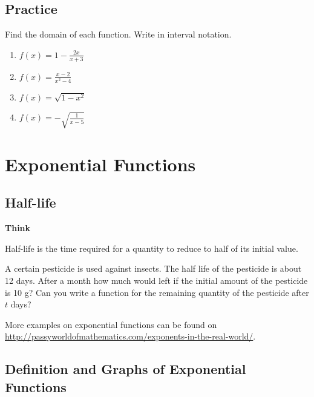 \documentclass[en,12pt]{elegantbook}
\providecommand{\tightlist}{%
  \setlength{\itemsep}{0pt}\setlength{\parskip}{0pt}}
\newenvironment{rmdthink}{
	\par\noindent
	{
		\makebox[-\width][r]{
			\footnotesize
			\color{green!90}\faLightbulbO
			\hspace*{3pt}
		}
			\textbf{
				\color{second}
				Think 
			}
    }
    \begin{shaded}
    \sffamily
}{
    \par\medskip\ignorespacesafterend
    \end{shaded}
}
\providecommand{\tightlist}{%
  \setlength{\itemsep}{0pt}\setlength{\parskip}{0pt}}
\let\BeginKnitrBlock\begin \let\EndKnitrBlock\end
\begin{document}
\hypertarget{practice-14}{%
\section{Practice}\label{practice-14}}

\BeginKnitrBlock{exercise}
\protect\hypertarget{exr:unnamed-chunk-275}{}{\label{exr:unnamed-chunk-275} }
Find the domain of each function. Write in interval notation.

\begin{enumerate}
\def\labelenumi{\arabic{enumi}.}
\tightlist
\item
  \(f(x)=1-\frac{2x}{x+3}\)
\item
  \(f(x)=\frac{x-2}{x^2-4}\)
\item
  \(f(x)=\sqrt{1-x^2}\)
\item
  \(f(x)=-\sqrt{\frac{1}{x-5}}\)
\end{enumerate}
\EndKnitrBlock{exercise}

\hypertarget{exponential-functions}{%
\chapter{Exponential Functions}\label{exponential-functions}}

\hypertarget{half-life}{%
\section{Half-life}\label{half-life}}

\begin{rmdthink}

Half-life is the time required for a quantity to reduce to half of its initial value.

A certain pesticide is used against insects. The half life of the pesticide is about 12 days. After a month how much would left if the initial amount of the pesticide is 10 g? Can you write a function for the remaining quantity of the pesticide after \(t\) days?

\end{rmdthink}

More examples on exponential functions can be found on \url{http://passyworldofmathematics.com/exponents-in-the-real-world/}.

\hypertarget{definition-and-graphs-of-exponential-functions}{%
\section{Definition and Graphs of Exponential Functions}\label{definition-and-graphs-of-exponential-functions}}
\end{document}
